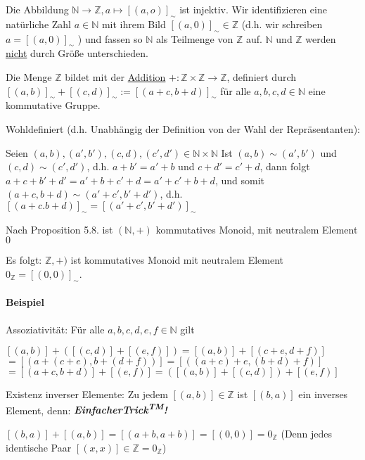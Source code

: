 \documentclass{../../meta/tudscript}
\begin{document}

Die Abbildung
\(\mathbb{N}\rightarrow \mathbb{Z}, a \mapsto [(a,o)]_\sim\) ist
injektiv. Wir identifizieren eine natürliche Zahl \(a \in \mathbb{N}\)
mit ihrem Bild \([(a,0)]_\sim \in \mathbb{Z}\) (d.h. wir schreiben
\(a=[(a,0)]_\sim\) ) und fassen so \(\mathbb{N}\) als Teilmenge von
\(\mathbb{Z}\) auf. \(\mathbb{N}\) und \(\mathbb{Z}\) werden
\underline{nicht} durch Größe unterschieden.


Die Menge \(\mathbb{Z}\) bildet mit der \underline{Addition}
\(+ : \mathbb{Z}\times \mathbb{Z}\rightarrow \mathbb{Z}\), definiert
durch \([(a,b)]_\sim + [(c,d)]_\sim := [(a+c, b+d)]_\sim\) für alle
\(a,b,c,d \in \mathbb{N}\) eine kommutative Gruppe.


Wohldefiniert (d.h. Unabhängig der Definition von der Wahl der
Repräsentanten):

Seien \((a,b),(a',b'),(c,d),(c',d') \in \mathbb{N}\times \mathbb{N}\)
Ist \((a,b) \sim (a',b')\) und \((c,d) \sim (c',d')\), d.h.
\(a+b'=a'+b\) und \(c+d'=c'+d\), dann folgt
\(a+c+b'+d'=a'+b+c'+d=a'+c'+b+d\), und somit
\((a+c,b+d) \sim (a'+c',b'+d')\), d.h.
\([(a+c.b+d)]_\sim = [(a'+c',b'+d')]_\sim\)

Nach Proposition 5.8. ist \((\mathbb{N},+)\) kommutatives Monoid, mit
neutralem Element \(0\)

Es folgt: \(\mathbb{Z},+)\) ist kommutatives Monoid mit neutralem
Element \(0_\mathbb{Z}= [(0,0)]_\sim\).

\paragraph{Beispiel}

Assoziativität: Für alle \(a,b,c,d,e,f \in \mathbb{N}\) gilt

\([(a,b)] + ( [(c,d)] + [(e,f)] ) = [(a,b)] + [(c+e,d+f)]\)
\(= [(a+(c+e),b+(d+f))] = [((a+c)+e,(b+d)+f)]\)
\(= [(a+c,b+d)] + [(e,f)] = ( [(a,b)] + [(c,d)] ) + [(e,f)]\)


Existenz inverser Elemente: Zu jedem \([(a,b)] \in \mathbb{Z}\) ist
\([(b,a)]\) ein inverses Element, denn:
\textit{\textbf{\textexclamdown EinfacherTrick\textsuperscript{TM}!}}

\([(b,a)] + [(a,b)] = [(a+b,a+b)] = [(0,0)] = 0_\mathbb{Z}\) (Denn jedes
identische Paar \([(x,x)] \in \mathbb{Z}= 0_\mathbb{Z}\))
\end{document}
